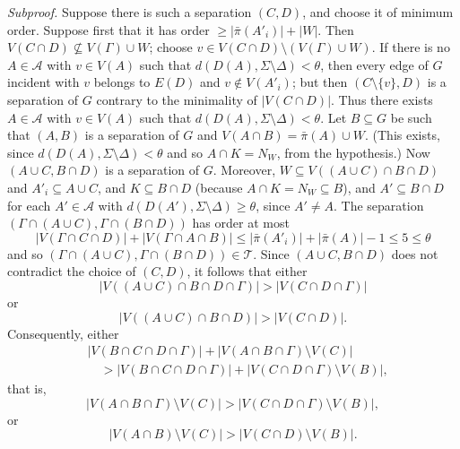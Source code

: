 \textit{Subproof.} Suppose there is such a separation $(C, D)$, and choose it of minimum order. Suppose first that it has order $\ge |\bar{\pi}(A'_i)| + |W|$. Then $V(C \cap D) \not\subseteq V(\Gamma) \cup W$; choose $v \in V(C \cap D) \setminus (V(\Gamma) \cup W)$. If there is no $A \in \mathcal{A}$ with $v \in V(A)$ such that $d(D(A), \Sigma \setminus \Delta) < \theta$, then every edge of $G$ incident with $v$ belongs to $E(D)$ and $v \notin V(A'_i)$; but then $(C \setminus \{v\}, D)$ is a separation of $G$ contrary to the minimality of $|V(C \cap D)|$. Thus there exists $A \in \mathcal{A}$ with $v \in V(A)$ such that $d(D(A), \Sigma \setminus \Delta) < \theta$. Let $B \subseteq G$ be such that $(A, B)$ is a separation of $G$ and $V(A \cap B) = \bar{\pi}(A) \cup W$. (This exists, since $d(D(A), \Sigma \setminus \Delta) < \theta$ and so $A \cap K = N_W$, from the hypothesis.) Now $(A \cup C, B \cap D)$ is a separation of $G$. Moreover, $W \subseteq V((A \cup C) \cap B \cap D)$ and $A'_i \subseteq A \cup C$, and $K \subseteq B \cap D$ (because $A \cap K = N_W \subseteq B$), and $A' \subseteq B \cap D$ for each $A' \in \mathcal{A}$ with $d(D(A'), \Sigma \setminus \Delta) \ge \theta$, since $A' \ne A$. The separation $(\Gamma \cap (A \cup C), \Gamma \cap (B \cap D))$ has order at most
\begin{equation*}
|V(\Gamma \cap C \cap D)| + |V(\Gamma \cap A \cap B)| \le |\bar{\pi}(A'_i)| + |\bar{\pi}(A)| - 1 \le 5 \le \theta
\end{equation*}
and so $(\Gamma \cap (A \cup C), \Gamma \cap (B \cap D)) \in \mathcal{T}$. Since $(A \cup C, B \cap D)$ does not contradict the choice of $(C, D)$, it follows that either
\begin{equation*}
|V((A \cup C) \cap B \cap D \cap \Gamma)| > |V(C \cap D \cap \Gamma)|
\end{equation*}
or
\begin{equation*}
|V((A \cup C) \cap B \cap D)| > |V(C \cap D)|.
\end{equation*}
Consequently, either
\begin{align*}
&|V(B \cap C \cap D \cap \Gamma)| + |V(A \cap B \cap \Gamma) \setminus V(C)| \\
&\quad > |V(B \cap C \cap D \cap \Gamma)| + |V(C \cap D \cap \Gamma) \setminus V(B)|,
\end{align*}
that is,
\begin{equation*}
|V(A \cap B \cap \Gamma) \setminus V(C)| > |V(C \cap D \cap \Gamma) \setminus V(B)|,
\end{equation*}
or
\begin{equation*}
|V(A \cap B) \setminus V(C)| > |V(C \cap D) \setminus V(B)|.
\end{equation*}
